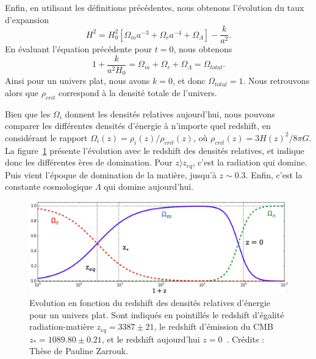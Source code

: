 \documentclass[11pt, twoside, a4paper, openright]{report}
\begin{document}
Enfin, en utilisant les définitions précédentes, nous obtenons l'évolution du taux d'expansion
\begin{equation}
  \label{eq:friedmann7}
  H^2 = H_0^2 \left[\Omega_m a^{-3} + \Omega_r a^{-4} + \Omega_{\Lambda} \right] - \frac{k}{a^{2}} .
\end{equation}
En évaluant l'équation précédente pour $t=0$, nous obtenons
\begin{equation}
  \label{eq:sum_omega}
 1 + \frac{k}{a^{2} H_{0}}  =  \Omega_m + \Omega_r + \Omega_{\Lambda} = \Omega_{total} .
\end{equation}
Ainsi pour un univers plat, nous avons $k = 0$, et donc $\Omega_{total} = 1$. Nous retrouvons alors que $\rho_{crit}$ correspond à la densité totale de l'univers. 

Bien que les $\Omega_i$ donnent les densités relatives aujourd'hui, nous pouvons comparer les différentes densités d'énergie à n'importe quel redshift, en considérant le rapport $\Omega_{i}(z) = \rho_{i}(z) / \rho_{crit}(z)$, où $\rho_{crit}(z) = 3H(z)^{2} / 8 \pi G$. La figure~\ref{fig:evol_omega} présente l'évolution  avec le redshift des densités relatives, et indique donc les différentes ères de domination. Pour $z \rangle z_{eq}$, c'est la radiation qui domine. Puis vient l'époque de domination de la matière, jusqu'à $z \sim 0.3$. Enfin, c'est la constante cosmologique $\Lambda$ qui domine aujourd'hui.
\begin{figure}
  \centering
  \includegraphics[scale=0.4]{evol_omega}
  \caption{Evolution en fonction du redshift des densités relatives d'énergie pour un univers plat. Sont indiqués en pointillés le redshift d'égalité radiation-matière $z_{eq} = 3387 \pm 21$, le redshift d'émission du CMB $z_{\ast} = 1089.80 \pm 0.21$, et le redshift aujourd'hui $z = 0$~\cite{CITEplanck2018}. Crédits : Thèse de Pauline Zarrouk.}
\label{fig:evol_omega}
\end{figure}
\end{document}
